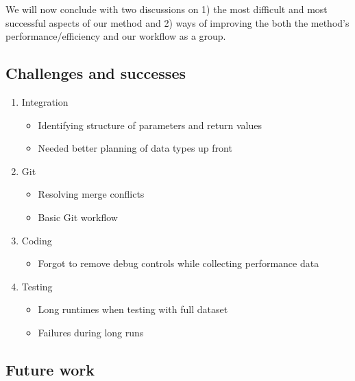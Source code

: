 \documentclass{article}
\begin{document}
We will now conclude with two discussions on 1) the most difficult and most successful aspects of our method and 2) ways of improving the both the method's performance/efficiency and our workflow as a group.

\subsection{Challenges and successes}

\begin{enumerate}
    \item Integration
		\begin{itemize}
			\item Identifying structure of parameters and return values
			\item Needed better planning of data types up front
		\end{itemize}
    \item Git
		\begin{itemize}
			\item Resolving merge conflicts
			\item Basic Git workflow
		\end{itemize}
    \item Coding
		\begin{itemize}
			\item Forgot to remove debug controls while collecting performance data
		\end{itemize}
    \item Testing
		\begin{itemize}
			\item Long runtimes when testing with full dataset
			\item Failures during long runs
		\end{itemize}
\end{enumerate}

\subsection{Future work}
\end{document}
